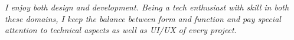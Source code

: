 \cventry{}
    {}
    {}
    {\textit{I enjoy both design and development. Being a tech enthusiast with skill in both these domains, I keep the balance between form and function and pay special attention to technical aspects as well as UI/UX of every project.}}
    {}
    {}
    \vspace*{0.2\baselineskip}

